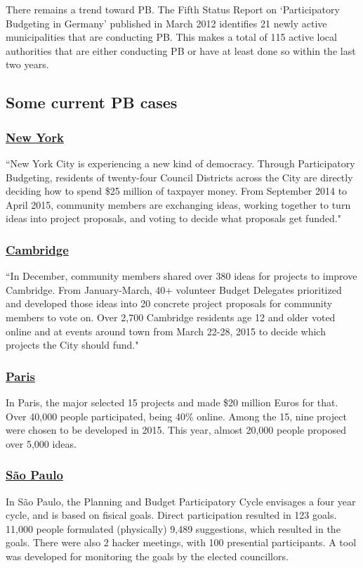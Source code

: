 There remains a trend toward PB. The Fifth Status Report on ‘Participatory Budgeting in Germany’ published in March 2012 identifies 21 newly active municipalities that are conducting PB. This makes a total of 115 active local authorities that are either conducting PB or have at least done so within the last two years.

\subsection{Some current PB cases}

\subsubsection{\href{http://pbnyc.org/}{New York}}
``New York City is experiencing a new kind of democracy. Through Participatory Budgeting, residents of twenty-four Council Districts across the City are directly deciding how to spend \$25 million of taxpayer money. From September 2014 to April 2015, community members are exchanging ideas, working together to turn ideas into project proposals, and voting to decide what proposals get funded."

\subsubsection{\href{http://cambridgema.nationbuilder.com}{Cambridge}}
``In December, community members shared over 380 ideas for projects to improve Cambridge.  From January-March, 40+ volunteer Budget Delegates prioritized and developed those ideas into 20 concrete project proposals for community members to vote on. Over 2,700 Cambridge residents age 12 and older voted online and at events around town from March 22-28, 2015 to decide which projects the City should fund."

\subsubsection{\href{https://budgetparticipatif.paris.fr}{Paris}}
In Paris, the major selected 15 projects and made \$20 million Euros for that. Over 40,000 people participated, being 40\% online. Among the 15, nine project were chosen to be developed in 2015. This year, almost 20,000 people proposed over 5,000 ideas.

\subsubsection{\href{http://planejasampa.prefeitura.sp.gov.br/}{São Paulo}}
In São Paulo, the Planning and Budget Participatory Cycle envisages a four year cycle, and is based on fisical goals. Direct participation resulted in 123 goals. 11,000 people formulated (physically) 9,489 suggestions, which resulted in the goals. There were also 2 hacker meetings, with 100 presential participants. A tool was developed for monitoring the goals by the elected councillors.

